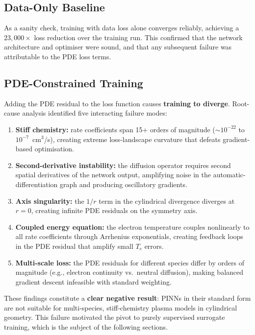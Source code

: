 \documentclass[12pt,a4paper]{article}
\begin{document}
\subsection{Data-Only Baseline}

As a sanity check, training with data loss alone converges reliably,
achieving a $23{,}000\times$ loss reduction over the training run.
This confirmed that the network architecture and optimiser were
sound, and that any subsequent failure was attributable to the PDE
loss terms.

\subsection{PDE-Constrained Training}

Adding the PDE residual to the loss function causes \textbf{training
to diverge}.  Root-cause analysis identified five interacting failure
modes:

\begin{enumerate}
  \item \textbf{Stiff chemistry:} rate coefficients span 15+ orders
        of magnitude ($\sim 10^{-22}$ to $10^{-7}$~cm$^3$/s),
        creating extreme loss-landscape curvature that defeats
        gradient-based optimisation.
  \item \textbf{Second-derivative instability:} the diffusion operator
        requires second spatial derivatives of the network output,
        amplifying noise in the automatic-differentiation graph and
        producing oscillatory gradients.
  \item \textbf{Axis singularity:} the $1/r$ term in the cylindrical
        divergence diverges at $r = 0$, creating infinite PDE
        residuals on the symmetry axis.
  \item \textbf{Coupled energy equation:} the electron temperature
        couples nonlinearly to all rate coefficients through
        Arrhenius exponentials, creating feedback loops in the PDE
        residual that amplify small $T_e$ errors.
  \item \textbf{Multi-scale loss:} the PDE residuals for different
        species differ by orders of magnitude (e.g., electron
        continuity vs.\ neutral diffusion), making balanced
        gradient descent infeasible with standard weighting.
\end{enumerate}

These findings constitute a \textbf{clear negative result}: PINNs in
their standard form are not suitable for multi-species,
stiff-chemistry plasma models in cylindrical geometry.  This failure
motivated the pivot to purely supervised surrogate training, which is
the subject of the following sections.
\end{document}
